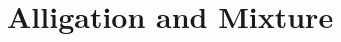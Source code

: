 \documentclass{book}
\begin{document}
% 

% 

\chapter{Alligation and Mixture}





% 




% 

\end{document}
